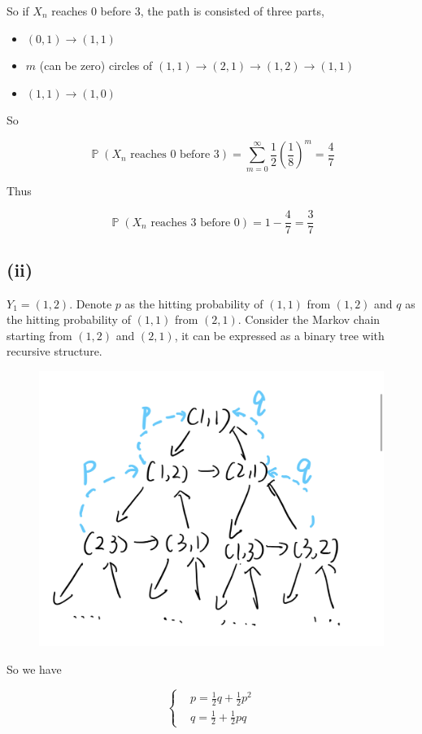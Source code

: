 \documentclass{article}
\DeclareMathOperator{\bP}{\mathbb{P}}
\begin{document}
So if $X_n$ reaches 0 before 3, the path is consisted of three parts,

\begin{itemize}
    \item $(0,1)\to (1,1)$
    \item $m$ (can be zero) circles of $(1,1) \to (2,1) \to (1,2) \to (1,1)$ 
    \item $(1,1)\to (1,0)$
\end{itemize}

So 

\begin{equation}
    \bP(X_n \text{ reaches } 0 \text{ before } 3) = \sum_{m=0}^{\infty} \frac{1}{2} (\frac{1}{8})^m = \frac{4}{7}
\end{equation}

Thus

\begin{equation}
    \bP(X_n \text{ reaches } 3 \text{ before } 0) = 1-\frac{4}{7} = \frac{3}{7}
\end{equation}

\subsection{(ii)}

$Y_1 = (1,2)$. Denote $p$ as the hitting probability of $(1,1)$ from $(1,2)$ and $q$ as the hitting probability of $(1,1)$ from $(2,1)$. Consider the Markov chain starting from $(1,2)$ and $(2,1)$, it can be expressed as a binary tree with recursive structure.

\begin{figure}[!htbp]
    \centering
    \includegraphics[width=0.4\linewidth]{s.jpg}
\end{figure}

So we have

\begin{equation}
    \left\{
        \begin{aligned}
            &p = \frac{1}{2} q + \frac{1}{2} p^2 \\
            &q = \frac{1}{2} + \frac{1}{2} pq
        \end{aligned}
    \right.
\end{equation}
\end{document}
